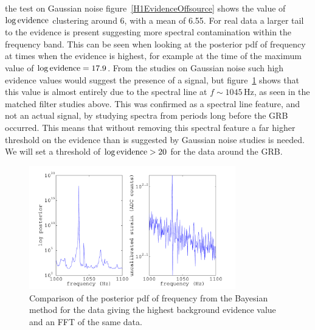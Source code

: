 the test on Gaussian noise figure~\ref{H1EvidenceOffsource} shows the value of $\log{\rm evidence}$
clustering around 6, with a mean of 6.55. For real data a larger tail to the evidence is present
suggesting more spectral contamination within the frequency band. This can be seen when looking at
the posterior pdf of frequency at times when the evidence is highest, for example at the time of the
maximum value of $\log{\rm evidence} = 17.9$. From the studies on Gaussian noise such high evidence
values would suggest the presence of a signal, but figure~\ref{H1OffsourcePosterior} shows that this
value is almost entirely due to the spectral line at $f \sim 1045$\,Hz, as seen in the matched
filter studies above. This was confirmed as a spectral line feature, and not an actual signal, by
studying spectra from periods long before the GRB occurred. This means that without removing this
spectral feature a far higher threshold on the evidence than is suggested by Gaussian noise studies
is needed. We will set a threshold of $\log{\rm evidence} > 20$ for the data around the GRB.
\begin{figure}[!htbp]
\begin{center}
\includegraphics[width=0.8\textwidth]{figs/H1OffsourcePosterior}\caption[Comparision of
posterior pdf with an FFT at the time of highest evidence.]{Comparison of the posterior pdf of
frequency from the Bayesian method for the data giving the highest background evidence value and an
FFT of the same data.}\label{H1OffsourcePosterior}
\end{center}
\end{figure}


